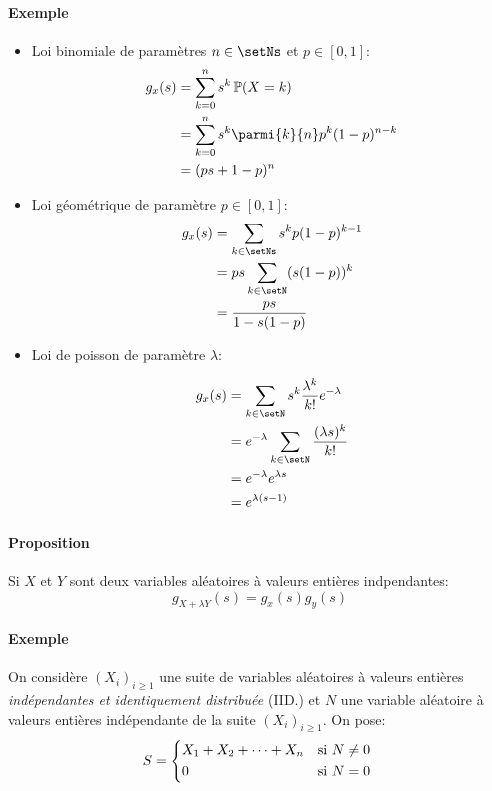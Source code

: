 \documentclass[a4paper,10pt,french,openany]{memoir}
\newcommand{\Proba}{\mathbb{P}}
\begin{document}
\paragraph{Exemple}
\begin{itemize}
 \item Loi binomiale de paramètres $n\in\setNs$ et $p\in[0,1]$:
 \begin{align*}
    g_x(s) &= \sum_{k=0}^n s^k\,\Proba(X=k) \\
    &= \sum_{k=0}^n s^k\parmi{k}{n} p^k (1-p)^{n-k} \\
    &= (p s + 1 - p)^n
 \end{align*}
 \item Loi géométrique de paramètre $p\in[0,1]$:
 \begin{align*}
    g_x(s) &= \sum_{k\in\setNs} s^k p (1-p)^{k-1} \\
    &= p s \sum_{k\in\setN} (s (1-p))^k \\
    &= \frac{p s}{1 - s(1-p)}
 \end{align*}
 \item Loi de poisson de paramètre $\lambda$:
 
 \begin{align*}
    g_x(s) &= \sum_{k\in\setN} s^k \frac{\lambda^k}{k!} e^{-\lambda} \\
    &= e^{-\lambda} \sum_{k\in\setN} \frac{(\lambda s)^k}{k!} \\
    &= e^{-\lambda} e^{\lambda s} \\
    &= e^{\lambda(s-1)}
 \end{align*}
\end{itemize}

\paragraph{Proposition}
Si $X$ et $Y$ sont deux variables aléatoires à valeurs entières indpendantes:
\[g_{X+\lambda Y}(s)=g_x(s) g_y(s)\]

\paragraph{Exemple}
On considère $(X_i)_{i\geq 1}$ une suite de variables aléatoires à valeurs entières \emph{indépendantes et identiquement distribuée} (IID.) et $N$ une variable aléatoire à valeurs entières indépendante de la suite $(X_i)_{i\geq 1}$. On pose:
\[S=\begin{cases*}
X_1+X_2+\dots+X_n & si $N\neq0$ \\ 
0 & si $N=0$
\end{cases*}\]
\end{document}
